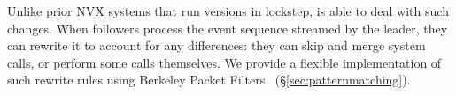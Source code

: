 
Unlike prior NVX systems that run versions in lockstep, \varan is able
to deal with such changes.  When followers process the
event sequence streamed by the leader, they can rewrite it to account
for any differences: \eg they can skip and merge system calls, or perform some
calls themselves.  We provide a flexible implementation of such rewrite rules
using Berkeley Packet Filters~\cite{bpf} (\S\ref{sec:patternmatching}).

